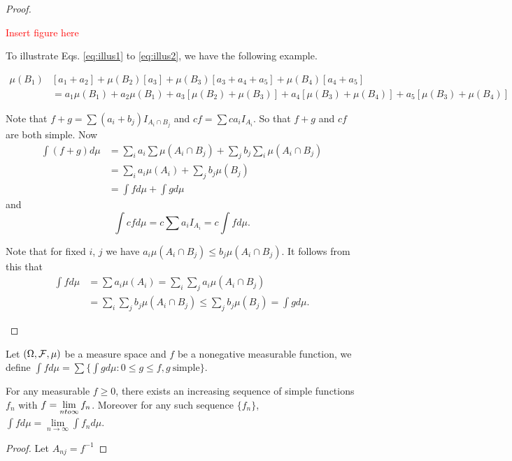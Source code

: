 \begin{proof}
\begin{prooflist}
\begin{example}
	\textcolor{red}{Insert figure here}
\end{example}

To illustrate Eqs. \ref{eq:illus1} to \ref{eq:illus2}, we have the following example.

\begin{example}
\begin{align*}
\mu(B_1)&[a_1+a_2]+\mu(B_2)[a_3]+\mu(B_3)[a_3+a_4+a_5]+\mu(B_4)[a_4+a_5]\\
	&=a_1\mu(B_1)+a_2\mu(B_1)+a_3[\mu(B_2)+\mu(B_3)]+a_4[\mu(B_3)+\mu(B_4)]+a_5[\mu(B_3)+\mu(B_4)]
\end{align*}

\end{example}


\item Note that $f+g=\sum(a_i+b_j)I_{A_i\cap B_j}$ and $cf=\sum ca_iI_{A_i}$. So that $f+g$ and $cf$ are both simple. Now
\begin{align*}
\int(f+g)d\mu&=\sum_i a_i \sum\mu(A_i\cap B_j)+\sum_j b_j\sum_i\mu(A_i\cap B_j)\\
	&=\sum_i a_i\mu(A_i)+\sum_j b_j\mu(B_j)\\
	&=\int fd\mu+\int gd\mu
\end{align*}
and
\begin{equation*}
\int cfd\mu = c\sum a_iI_{A_i}=c\int fd\mu.
\end{equation*}

\item Note that for fixed $i$, $j$ we have $a_i\mu(A_i\cap B_j)\leq b_j\mu(A_i\cap B_j)$. It follows from this that
\begin{align*}
\int fd\mu&=\sum a_i\mu(A_i)=\sum_i\sum_j a_i\mu(A_i\cap B_j)\\
	&=\sum_i\sum_j b_j\mu(A_i\cap B_j)\leq \sum_j b_j\mu(B_j)=\int gd\mu.
\end{align*}
\end{prooflist}
\end{proof}


\begin{definition}
Let $(\Omega, \mathcal F, \mu)$ be a measure space and $f$ be a nonegative measurable function, we define $\int f d\mu=\sum\{\int gd\mu: 0\leq g\leq f, g\ \text{simple} \}$.
\end{definition}

\begin{theorem}
For any measurable $f\geq 0$, there exists an increasing sequence of simple functions $f_n$ with $f=\lim\limits_{n\\to \infty}f_n$. Moreover for any such sequence $\{f_n \}$, $\int fd\mu=\lim\limits_{n\to \infty}\int f_nd\mu$.
\end{theorem}

\begin{proof}
Let $A_{nj}=f^{-1}$
\end{proof}
